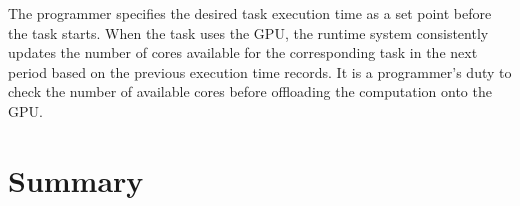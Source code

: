 \documentclass[times, 10pt, twocolumn]{article}
\begin{document}
The programmer specifies the desired task execution time as a set point
before the task starts.
When the task uses the GPU, the runtime system consistently updates the
number of cores available for the corresponding task in the next period
based on the previous execution time records.
It is a programmer's duty to check the number of available cores before
offloading the computation onto the GPU.


\section{Summary}
\label{sec:summary}


{\footnotesize

}
\end{document}
